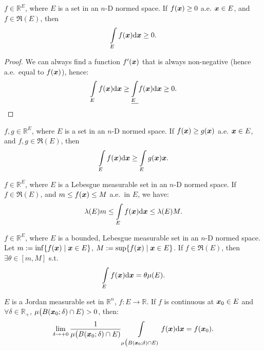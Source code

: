 \documentclass[openany]{book}
\begin{document}
\begin{theorem}\label{theorem: the integral of a non-negative function is also non-negative}
	$f \in \mathbb R^E$, where $E$ is a set in an $n$-D normed space.
	If $f(\boldsymbol{x}) \geq 0$ a.e. $\boldsymbol{x} \in E$, and $f \in \mathfrak R(E)$, then
	\begin{equation*}
		\int\limits_E f(\boldsymbol{x}) \mathrm{d} \boldsymbol{x} \geq 0.
	\end{equation*}
\end{theorem}
\begin{proof}
	We can always find a function $f'(\boldsymbol{x})$ that is always non-negative (hence a.e.\ equal to $f(\boldsymbol{x})$), hence:
	\begin{equation*}
		\int\limits_E f(\boldsymbol{x}) \mathrm{d} \boldsymbol{x} 
			\geq \underline{\int\limits_E} f(\boldsymbol{x}) \mathrm{d} \boldsymbol{x} \geq 0.
	\end{equation*}
\end{proof}

\begin{corollary}
	$f, g \in \mathbb R^E$, where $E$ is a set in an $n$-D normed space.
	If $f(\boldsymbol{x}) \geq g(\boldsymbol{x})$ a.e. $\boldsymbol{x} \in E$, and $f, g \in \mathfrak R(E)$, then
	\begin{equation*}
		\int\limits_E f(\boldsymbol{x}) \mathrm{d} \boldsymbol{x} \geq \int\limits_E g(\boldsymbol{x}) \boldsymbol{x}.
	\end{equation*}
\end{corollary}

\begin{corollary}\label{corollary: integral average}
	$f \in \mathbb R^E$, where $E$ is a Lebesgue measurable set in an $n$-D normed space. 
	If $f \in \mathfrak R(E)$, and $m \leq f(\boldsymbol{x}) \leq M$ a.e.\ in $E$, we have:
	\begin{equation*}
		\lambda(E) m \leq \int\limits_E f(\boldsymbol{x}) \mathrm{d} \boldsymbol{x} \leq \lambda(E) M.
	\end{equation*}
\end{corollary}

\begin{corollary}
	$f \in \mathbb R^E$, where $E$ is a bounded, Lebesgue measurable set in an $n$-D normed space. 
	Let $m := \inf\{f(\boldsymbol{x}) \mid \boldsymbol{x} \in E\}$, $M := \sup\{f(\boldsymbol{x}) \mid \boldsymbol{x} \in E\}$.
	If $f \in \mathfrak R(E)$, then $\exists \theta \in [m, M]$ s.t.\ 
	\begin{equation*}
		\int\limits_E f(\boldsymbol{x}) \mathrm{d} \boldsymbol{x} = \theta \mu(E).
	\end{equation*}
\end{corollary}

\begin{corollary}
	$E$ is a Jordan measurable set in $\mathbb R^n$, $f \colon E \to \mathbb R$. 
	If $f$ is continuous at $\boldsymbol{x}_0 \in E$ and $\forall \delta \in \mathbb R_+$, $\mu \big( B(\boldsymbol{x}_0; \delta) \cap E) > 0$, then:
	\begin{equation*}
		\lim_{\delta \to +0} \frac{1}{\mu \big( B(\boldsymbol{x}_0; \delta) \cap E)} \int\limits_{\mu \big( B(\boldsymbol{x}_0; \delta) \cap E)} f(\boldsymbol{x}) \mathrm{d} \boldsymbol{x} = f(\boldsymbol{x}_0).
	\end{equation*} 
\end{corollary}
\end{document}
